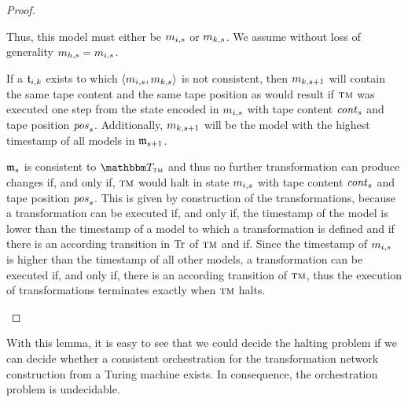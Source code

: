 \begin{proof}
\begin{properenumerate}
            Thus, this model must either be $m_{i,s}$ or $m_{k,s}$.
            We assume without loss of generality $m_{h,s} = m_{i,s}$.            
		 \item
            If a $\mathfrak{t}_{i,k}$ exists to which $\langle m_{i,s},m_{k,s} \rangle$ is not consistent, then $m_{k,s+1}$ %
            will contain the same tape content and the same tape position as would result if $\textsc{tm}$ was executed one step from the state encoded in $m_{i,s}$ with tape content $\mathit{cont}_s$ and tape position $\mathit{pos}_s$.
		 	Additionally, $m_{k,s+1}$ will be the model with the highest timestamp of all models in $\mathfrak{m}_{s+1}$.
		 \item 
             $\mathfrak{m}_{s}$ is consistent to $\transformationset{T}_{\TuringMachine}$ and thus no further transformation can produce changes if, and only if, $\textsc{tm}$ would halt in state $m_{i,s}$ with tape content $\mathit{cont}_s$ and tape position $\mathit{pos}_s$.
             This is given by construction of the transformations, because a transformation can be executed if, and only if, the timestamp of the model is lower than the timestamp of a model to which a transformation is defined and if there is an according transition in $\operatorname{Tr}$ of $\textsc{tm}$ and if.
             Since the timestamp of $m_{i,s}$ is higher than the timestamp of all other models, a transformation can be executed if, and only if, there is an according transition of $\textsc{tm}$, thus the execution of transformations terminates exactly when $\textsc{tm}$ halts.
		 	\qedhere
	\end{properenumerate}
\end{proof}

With this lemma, it is easy to see that we could decide the halting problem if we can decide whether a consistent orchestration for the transformation network construction from a Turing machine exists.
In consequence, the orchestration problem is undecidable.

